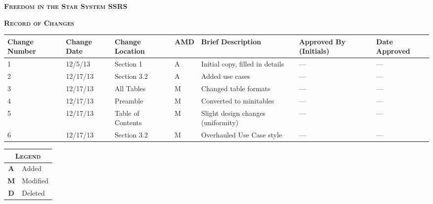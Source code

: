 \documentclass[twoside,letterpaper]{article}
\begin{document}
\clearpage
\begin{minipage}{\linewidth}
\centering
\textsc{
	\textbf{Freedom in the Star System SSRS}}

\vspace{2em}

\textsc{
	\textbf{Record of Changes}}
	
\end{minipage}

\begin{minipage}{\linewidth}
\centering
\begin{tabularx}{\textwidth}{XXXXPXX}\toprule[1.5pt] %

\bf Change Number & \bf Change Date & \bf Change Location & \bf A\newline M\newline D & \bf Brief \newline Description & \bf Approved By \newline (Initials) & \bf Date Approved \\ \midrule[1.0pt]

1 & 12/5/13 & Section 1 & A & Initial copy, filled in details & --- & ---\\
2 & 12/17/13 & Section 3.2 & A & Added use cases & --- & ---\\
3 & 12/17/13 & All Tables & M & Changed table formats & --- & ---\\
4 & 12/17/13 & Preamble & M & Converted to minitables & --- & ---\\
5 & 12/17/13 & Table of Contents & M & Slight design changes (uniformity) & --- & ---\\
6 & 12/17/13 & Section 3.2 & M & Overhauled Use Case style & --- & ---\\

\bottomrule[1.5pt]
\end{tabularx}\par

\bigskip
\raggedleft %
\begin{tabular}{c l}
\multicolumn{2}{c}{\textsc{Legend}} \\ \midrule[0.5pt]
\textsc{\textbf{A}}   & Added\\
\textsc{\textbf{M}}   & Modified\\
\textsc{\textbf{D}}	  & Deleted\\
\end{tabular}
\end{minipage}
\end{document}
